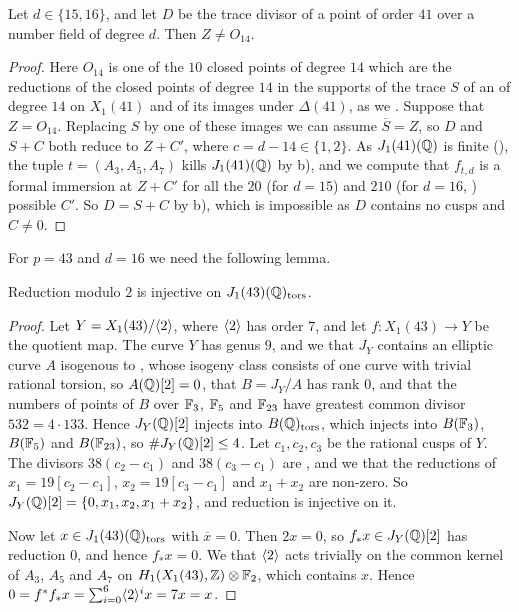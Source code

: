 \begin{proposition}\label{prop:41}
Let $d\in\{15,16\}$, and let $D$ be the trace divisor of a point of order $41$ over a number field of degree $d$. Then $Z\neq O_{14}$.
\end{proposition}

\begin{proof}
Here $O_{14}$ is one of the $10$ closed points of degree $14$ which are the reductions of the closed points of degree $14$ in the supports of the trace $S$ of an  of degree $14$ on $X_1(41)$ and of its images under $\Delta(41)$, as we . Suppose that $Z=O_{14}$. Replacing $S$ by one of these images we can assume $\overline S=Z$, so $D$ and $S+C$ both reduce to $Z+C'$, where $c=d-14\in\{1,2\}$. As $J_1(41)(\mathbb{Q})$ is finite (), the tuple $t=(A_3,A_5,A_7)$ kills $J_1(41)(\mathbb{Q})$ by  b), and we compute that $f_{t,d}$ is a formal immersion at $Z+C'$ for all the $20$ (for $d=15$) and $210$ (for $d=16$, ) possible $C'$. So $D=S+C$ by  b), which is impossible as $D$ contains no cusps and $C\neq0$.
\end{proof}

For $p=43$ and $d=16$ we need the following lemma.

\begin{lemma}\label{lem:43inj}
Reduction modulo $2$ is injective on $J_1(43)(\mathbb{Q})_{\mathrm{tors}}$.
\end{lemma}

\begin{proof}
Let $Y=X_1(43)/\langle 2\rangle$, where $\langle 2\rangle$ has order $7$, and let $f:X_1(43)\to Y$ be the quotient map. The curve $Y$ has genus $9$, and we  that $J_Y$ contains an elliptic curve $A$ isogenous to , whose isogeny class consists of one curve with trivial rational torsion, so $A(\mathbb{Q})[2]=0$, that $B=J_Y/A$ has rank $0$, and that the numbers of points of $B$ over $\mathbb{F}_3$, $\mathbb{F}_5$ and $\mathbb{F}_{23}$ have greatest common divisor $532=4\cdot 133$. Hence $J_Y(\mathbb{Q})[2]$ injects into $B(\mathbb{Q})_{\mathrm{tors}}$, which injects into $B(\mathbb{F}_3)$, $B(\mathbb{F}_5)$ and $B(\mathbb{F}_{23})$, so $\#J_Y(\mathbb{Q})[2]\leq4$. Let $c_1,c_2,c_3$ be the rational cusps of $Y$. The divisors $38(c_2-c_1)$ and $38(c_3-c_1)$ are , and we  that the reductions of $x_1=19[c_2-c_1]$, $x_2=19[c_3-c_1]$ and $x_1+x_2$ are non-zero. So $J_Y(\mathbb{Q})[2]=\{0,x_1,x_2,x_1+x_2\}$, and reduction is injective on it.

Now let $x\in J_1(43)(\mathbb{Q})_{\mathrm{tors}}$ with $\overline x=0$. Then $2x=0$, so $f_*x\in J_Y(\mathbb{Q})[2]$ has reduction $0$, and hence $f_*x=0$. We  that $\langle 2\rangle$ acts trivially on the common kernel of $A_3$, $A_5$ and $A_7$ on $H_1(X_1(43),\mathbb{Z})\otimes\mathbb{F}_2$, which contains $x$. Hence $0=f^*f_*x=\sum_{i=0}^6\langle 2\rangle^ix=7x=x$.
\end{proof}

